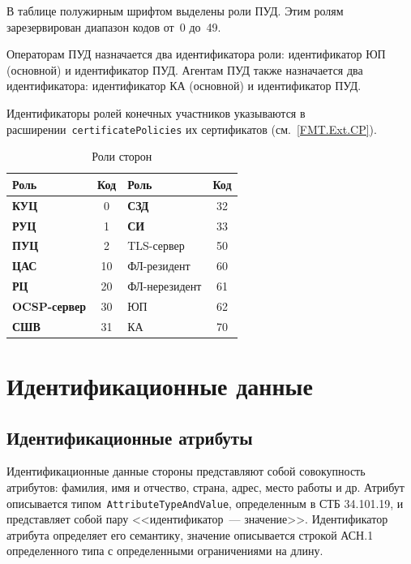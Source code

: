 В таблице полужирным шрифтом выделены роли ПУД.
Этим ролям зарезервирован диапазон кодов от~0 до~49.

Операторам ПУД назначается два идентификатора роли: 
идентификатор ЮП (основной) и идентификатор ПУД. 
%
Агентам ПУД также назначается два идентификатора: 
идентификатор КА (основной) и идентификатор ПУД. 

Идентификаторы ролей конечных участников указываются в 
расширении~\texttt{certificatePolicies} их сертификатов
(см.~\ref{FMT.Ext.CP}).

\begin{table}[bht]
\caption{Роли сторон}
\label{Table.ENTITIES.Roles}
\begin{tabular}{|l|c||l|c|}
\hline
Роль & Код & Роль & Код\\
\hline
\hline
{\bf КУЦ}        & 0    & {\bf СЗД}      & 32 \\
{\bf РУЦ}        & 1    & {\bf СИ}       & 33 \\
{\bf ПУЦ}        & 2    & TLS-сервер     & 50 \\
{\bf ЦАС}        & 10   & ФЛ-резидент    & 60 \\
{\bf РЦ}         & 20   & ФЛ-нерезидент  & 61 \\
{\bf OCSP-сервер}& 30   & ЮП             & 62 \\
{\bf СШВ}        & 31   & КА             & 70 \\
\hline
\end{tabular}
\end{table}

\section{Идентификационные данные}\label{ENTITIES.Name}

\subsection{Идентификационные атрибуты}\label{ENTITIES.Attrs}

Идентификационные данные стороны представляют собой совокупность атрибутов: 
фамилия, имя и отчество, страна, адрес, место работы и др.  
%
Атрибут описывается типом~\texttt{AttributeTypeAndValue}, определенным в 
СТБ 34.101.19, и представляет собой пару <<идентификатор~--- значение>>. 
Идентификатор атрибута определяет его семантику, 
значение описывается строкой АСН.1 определенного типа с определенными 
ограничениями на длину.  

